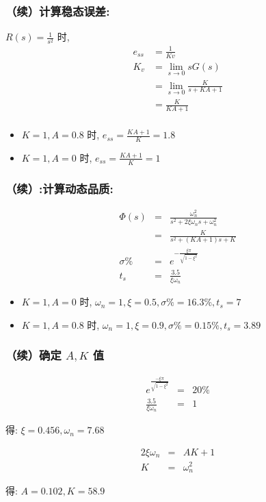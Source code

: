 \documentclass{article}
\begin{document}
\begin{frame}
\frametitle{（续）计算稳态误差:}
\label{sec-4-1-3}

 $R(s)=\frac{1}{s^2}$ 时,
\begin{align*}
e_{ss} &= \frac{1}{Kv} \\
K_v &= \lim_{s\rightarrow 0}sG(s) \\
    &= \lim_{s\rightarrow 0}\frac{K}{s+KA+1} \\
    &= \frac{K}{KA+1} \\
\end{align*}

\begin{itemize}
\item $K=1,A=0.8$ 时, $e_{ss}=\frac{KA+1}{K}=1.8$
\item $K=1,A=0$ 时, $e_{ss}=\frac{KA+1}{K}=1$
\end{itemize}
\end{frame}
\begin{frame}
\frametitle{（续）:计算动态品质:}
\label{sec-4-1-4}


\begin{eqnarray*}
\Phi(s) &=& \frac{\omega_n^2}{s^2+2\xi\omega_n s+\omega_n^2} \\
        &=& \frac{K}{s^2+(KA+1)s+K} \\
\sigma\% &=& e^{-\frac{\xi\pi}{\sqrt{1-\xi^2}}} \\
t_s &=& \frac{3.5}{\xi\omega_n}
\end{eqnarray*}

\begin{itemize}
\item <2-> $K=1,A=0$ 时, $\omega_n=1,\xi=0.5,\sigma\%=16.3\%,t_s=7$
\item <3-> $K=1,A=0.8$ 时, $\omega_n=1,\xi=0.9,\sigma\%=0.15\%,t_s=3.89$
\end{itemize}
\end{frame}
\begin{frame}
\frametitle{（续）确定 $A,K$ 值}
\label{sec-4-1-5}



\begin{eqnarray*}
e^{\frac{-\xi\pi}{\sqrt{1-\xi^2}}} &=&20\% \\
\frac{3.5}{\xi\omega_n} &=& 1
\end{eqnarray*}

得: $\xi=0.456,\omega_n=7.68$

\begin{eqnarray*}
2\xi\omega_n & = & AK+1\\
K &=& \omega_n^2
\end{eqnarray*}

得: $A=0.102,K=58.9$
\end{frame}
\end{document}
